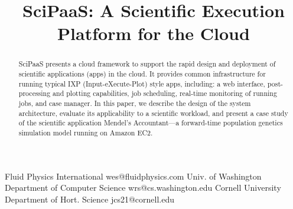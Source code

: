 \documentclass[10pt,reprint]{socc14}
\begin{document}
\setlength{\pdfpageheight}{\paperheight}
\setlength{\pdfpagewidth}{\paperwidth}






\title{SciPaaS: A Scientific Execution Platform for the Cloud}

           {Fluid Physics International}
           {wes@fluidphysics.com}
           {Univ. of Washington}
           {Department of Computer Science}
           {wrs@cs.washington.edu}
           {Cornell University}
           {Department of Hort. Science}
           {jcs21@cornell.edu}

\maketitle

\begin{abstract}
SciPaaS presents a cloud framework to support the rapid design and deployment of scientific applications (apps) in the cloud.  It provides common infrastructure for running typical IXP (Input-eXecute-Plot) style apps, including: a web interface, post-processing and plotting capabilities, job scheduling, real-time monitoring of running jobs, and case manager.  In this paper, we describe the design of the system architecture, evaluate its applicability to a scientific workload, and present a case study of the scientific application Mendel’s Accountant—a forward-time population genetics simulation model running on Amazon EC2.
\end{abstract}
\end{document}
